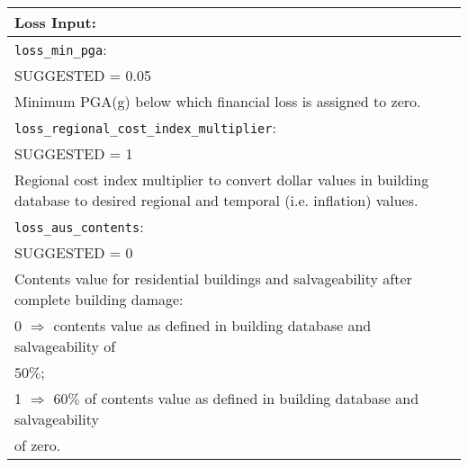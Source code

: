 \documentclass[a4paper, 12pt]{report}
\begin{document}
\vspace{2em}
\begin{tabular}{|p{\textwidth}|}
\hline
\vspace{0.3em} \noindent \Large \textbf{Loss Input:} \normalsize \\
\hline \vspace{0.1em} \texttt{loss\_min\_pga}: \\
SUGGESTED = 0.05 \\
Minimum PGA(g) below which financial loss is assigned to zero. \\
\hline
\vspace{0.1em} \texttt{loss\_regional\_cost\_index\_multiplier}: \\
SUGGESTED = 1 \\
Regional cost index multiplier to convert dollar values in building
database to desired regional and temporal (i.e. inflation) values.\\
\hline \vspace{0.1em} \texttt{loss\_aus\_contents}: \\
SUGGESTED = 0 \\
Contents value for residential buildings and salvageability after complete building damage:   \\
\hspace{0.5em} 0 $\Rightarrow$ contents value as defined in building
  database and salvageability of \\
  \hspace{2.5em} $50\%$;\\
\hspace{0.5em} 1 $\Rightarrow$ $60\%$ of contents value as defined in
building database and salvageability \\
\hspace{2.5em} of zero.\\
  \hline
 \end{tabular}
\end{document}
